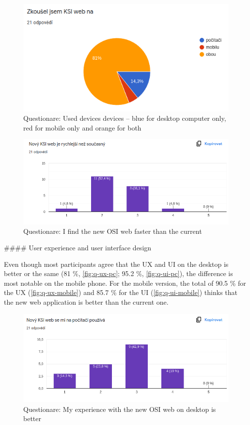 \documentclass[
  digital, %
  oneside, %
  lof,     %
  lot,     %
]{fithesis4}
\begin{document}
{\begin{figure}
\includegraphics[width=\textwidth]{assets/img/questionare/device}
\caption{Questionare: Used devices devices -- blue for desktop computer only, red for mobile only and orange for both}
\label{fig:q-device}
\end{figure}

\begin{figure}
\includegraphics[width=\textwidth]{assets/img/questionare/faster}
\caption{Questionare: I find the new OSI web faster than the current}
\label{fig:q-speed}
\end{figure}


#### User experience and user interface design

Even though most participants agree that the UX and UI on the desktop is better or the same (81 \%, \autoref{fig:q-ux-pc}; 95.2 \%, \autoref{fig:q-ui-pc}), the difference is most notable on the mobile phone. For the mobile version, the total of 90.5 \% for the UX (\autoref{fig:q-ux-mobile}) and  85.7 \% for the UI (\autoref{fig:q-ui-mobile}) thinks that the new web application is better than the current one.

\begin{figure}
\includegraphics[width=\textwidth]{assets/img/questionare/pc-ux}
\caption{Questionare: My experience with the new OSI web on desktop is better}
\label{fig:q-ux-pc}
\end{figure}

}
\end{document}
